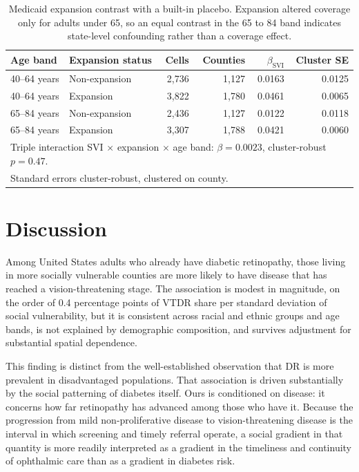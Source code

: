 \documentclass[11pt]{article}
\begin{document}
\begin{table}[htbp]
\centering
\caption{Medicaid expansion contrast with a built-in placebo. Expansion altered
coverage only for adults under 65, so an equal contrast in the 65 to 84 band
indicates state-level confounding rather than a coverage effect.}
\label{tab:expansion}
\begin{tabular}{llrrrr}
\toprule
Age band & Expansion status & Cells & Counties & $\beta_{\mathrm{SVI}}$ & Cluster SE \\
\midrule
40--64 years & Non-expansion & 2,736 & 1,127 & 0.0163 & 0.0125 \\
40--64 years & Expansion     & 3,822 & 1,780 & 0.0461 & 0.0065 \\
65--84 years & Non-expansion & 2,436 & 1,127 & 0.0122 & 0.0118 \\
65--84 years & Expansion     & 3,307 & 1,788 & 0.0421 & 0.0060 \\
\midrule
\multicolumn{6}{l}{\footnotesize Triple interaction SVI $\times$ expansion
$\times$ age band: $\beta = 0.0023$, cluster-robust $p = 0.47$.}\\
\multicolumn{6}{l}{\footnotesize Standard errors cluster-robust, clustered on county.}\\
\bottomrule
\end{tabular}
\end{table}

\clearpage

\section{Discussion}

Among United States adults who already have diabetic retinopathy, those living
in more socially vulnerable counties are more likely to have disease that has
reached a vision-threatening stage. The association is modest in magnitude, on
the order of 0.4 percentage points of VTDR share per standard deviation of
social vulnerability, but it is consistent across racial and ethnic groups and
age bands, is not explained by demographic composition, and survives adjustment
for substantial spatial dependence.

This finding is distinct from the well-established observation that DR is more
prevalent in disadvantaged populations. That association is driven substantially
by the social patterning of diabetes itself. Ours is conditioned on disease: it
concerns how far retinopathy has advanced among those who have it. Because the
progression from mild non-proliferative disease to vision-threatening disease is
the interval in which screening and timely referral operate, a social gradient
in that quantity is more readily interpreted as a gradient in the timeliness and
continuity of ophthalmic care than as a gradient in diabetes risk.
\end{document}
